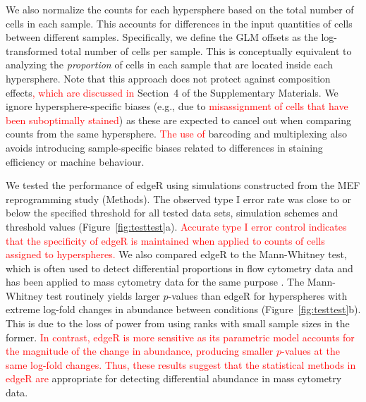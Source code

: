 \documentclass{article}
\newcommand\revised[1]{\textcolor{red}{#1}}
\newcommand{\suppcomponorm}{4}
\begin{document}
We also normalize the counts for each hypersphere based on the total number of cells in each sample.
This accounts for differences in the input quantities of cells between different samples.
Specifically, we define the GLM offsets as the log-transformed total number of cells per sample.
This is conceptually equivalent to analyzing the \textit{proportion} of cells in each sample that are located inside each hypersphere.
Note that this approach does not protect against composition effects\revised{, which are discussed in} Section~\suppcomponorm{} of the Supplementary Materials.
We ignore hypersphere-specific biases (e.g., due to \revised{misassignment of cells that have been suboptimally stained}) as these are expected to cancel out when comparing counts from the same hypersphere.
\revised{The use of} barcoding and multiplexing also avoids introducing sample-specific biases related to differences in staining efficiency or machine behaviour.


We tested the performance of edgeR using simulations constructed from the MEF reprogramming study (Methods).
The observed type I error rate was close to or below the specified threshold for all tested data sets, simulation schemes and threshold values (Figure~\ref{fig:testtest}a).
\revised{Accurate type I error control indicates that the specificity of edgeR is maintained when applied to counts of cells assigned to hyperspheres.}
We also compared edgeR to the Mann-Whitney test, which is often used to detect differential proportions in flow cytometry data \cite{watson1992significance} and has been applied to mass cytometry data for the same purpose \cite{behbehani2015mass}.
The Mann-Whitney test routinely yields larger $p$-values than edgeR for hyperspheres with extreme log-fold changes in abundance between conditions (Figure~\ref{fig:testtest}b).
This is due to the loss of power from using ranks with small sample sizes in the former.
\revised{In contrast, edgeR is more sensitive as its parametric model accounts for the magnitude of the change in abundance, producing smaller $p$-values at the same log-fold changes.
Thus, these results suggest that the statistical methods in edgeR are} appropriate for detecting differential abundance in mass cytometry data.
\end{document}
